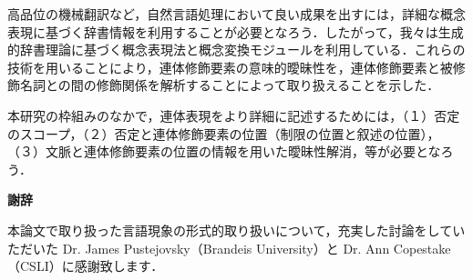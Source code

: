 高品位の機械翻訳など，自然言語処理において良い成果を出すには，詳細な概念
表現に基づく辞書情報を利用することが必要となろう．したがって，我々は生成
的辞書理論に基づく概念表現法と概念変換モジュールを利用している．これらの
技術を用いることにより，連体修飾要素の意味的曖昧性を，連体修飾要素と被修
飾名詞との間の修飾関係を解析することによって取り扱えることを示した．

本研究の枠組みのなかで，連体表現をより詳細に記述するためには，（１）否定
のスコープ，（２）否定と連体修飾要素の位置（制限の位置と叙述の位置），
（３）文脈と連体修飾要素の位置の情報を用いた曖昧性解消，等が必要となろう．

\begin{flushleft}
{\bf 謝辞}  
\end{flushleft}

本論文で取り扱った言語現象の形式的取り扱いについて，充実した討論をしてい
ただいた Dr. James Pustejovsky（Brandeis University）と Dr. Ann
Copestake（CSLI）に感謝致します．







\begin{biography}


\end{biography}


